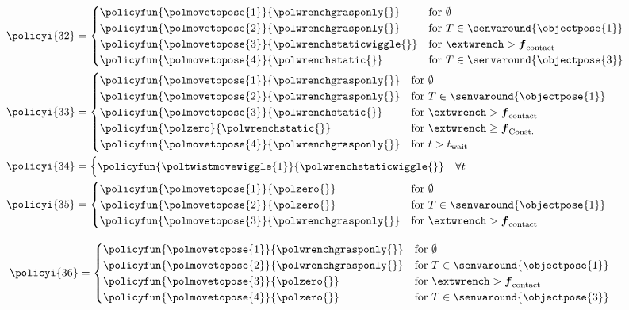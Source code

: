 \begin{align*}
&\policyi{32}=\begin{cases}
\policyfun{\polmovetopose{1}}{\polwrenchgrasponly{}} & \text{for } \emptyset \\
\policyfun{\polmovetopose{2}}{\polwrenchgrasponly{}} & \text{for } T \in \senvaround{\objectpose{1}} \\
\policyfun{\polmovetopose{3}}{\polwrenchstaticwiggle{}} & \text{for } \extwrench > \boldsymbol{f}_\text{contact} \\
\policyfun{\polmovetopose{4}}{\polwrenchstatic{}} & \text{for } T \in \senvaround{\objectpose{3}}
\end{cases}\\
&\policyi{33}=\begin{cases}
\policyfun{\polmovetopose{1}}{\polwrenchgrasponly{}} & \text{for } \emptyset \\
\policyfun{\polmovetopose{2}}{\polwrenchgrasponly{}} & \text{for } T \in \senvaround{\objectpose{1}} \\
\policyfun{\polmovetopose{3}}{\polwrenchstatic{}} & \text{for } \extwrench > \boldsymbol{f}_\text{contact}\\
\policyfun{\polzero}{\polwrenchstatic{}} & \text{for } \extwrench \geq \boldsymbol{f}_\text{Const.}\\
\policyfun{\polmovetopose{4}}{\polwrenchgrasponly{}} & \text{for } t>t_\text{wait}
\end{cases}\\
&\policyi{34}=\begin{cases}
\policyfun{\poltwistmovewiggle{1}}{\polwrenchstaticwiggle{}} & \forall t
\end{cases}\\
&\policyi{35}=\begin{cases}
\policyfun{\polmovetopose{1}}{\polzero{}} & \text{for } \emptyset \\
\policyfun{\polmovetopose{2}}{\polzero{}} & \text{for } T \in \senvaround{\objectpose{1}} \\
\policyfun{\polmovetopose{3}}{\polwrenchgrasponly{}} & \text{for } \extwrench > \boldsymbol{f}_\text{contact}
\end{cases}
\end{align*}


\begin{align*}
&\policyi{36}=\begin{cases}
\policyfun{\polmovetopose{1}}{\polwrenchgrasponly{}} & \text{for } \emptyset \\
\policyfun{\polmovetopose{2}}{\polwrenchgrasponly{}} & \text{for } T \in \senvaround{\objectpose{1}} \\
\policyfun{\polmovetopose{3}}{\polzero{}} & \text{for } \extwrench > \boldsymbol{f}_\text{contact}\\
\policyfun{\polmovetopose{4}}{\polzero{}} & \text{for } T \in \senvaround{\objectpose{3}}
\end{cases}
\end{align*}